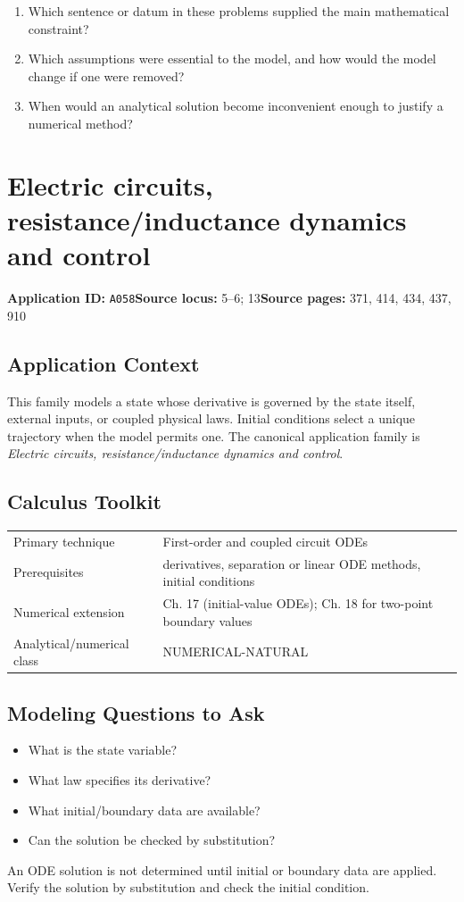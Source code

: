 \documentclass[11pt]{book}
\newcommand{\pid}[1]{\texttt{#1}}
\begin{document}
\begin{reflectionbox}\begin{enumerate}
\item Which sentence or datum in these problems supplied the main mathematical constraint?
\item Which assumptions were essential to the model, and how would the model change if one were removed?
\item When would an analytical solution become inconvenient enough to justify a numerical method?
\end{enumerate}\end{reflectionbox}
\chapter{Electric circuits, resistance/inductance dynamics and control}\label{app:A058}
\textbf{Application ID:} \pid{A058}\quad \textbf{Source locus:} 5–6; 13\quad \textbf{Source pages:} 371, 414, 434, 437, 910
\section*{Application Context}
This family models a state whose derivative is governed by the state itself, external inputs, or coupled physical laws. Initial conditions select a unique trajectory when the model permits one. The canonical application family is \emph{Electric circuits, resistance/inductance dynamics and control}.
\section*{Calculus Toolkit}
\begin{tabularx}{\textwidth}{@{}lX@{}}\toprule
Primary technique & First-order and coupled circuit ODEs \\
Prerequisites & derivatives, separation or linear ODE methods, initial conditions \\
Numerical extension & Ch. 17 (initial-value ODEs); Ch. 18 for two-point boundary values \\
Analytical/numerical class & NUMERICAL-NATURAL \\
\bottomrule\end{tabularx}
\section*{Modeling Questions to Ask}\begin{itemize}
\item What is the state variable?
\item What law specifies its derivative?
\item What initial/boundary data are available?
\item Can the solution be checked by substitution?
\end{itemize}
\begin{errorbox}An ODE solution is not determined until initial or boundary data are applied. Verify the solution by substitution and check the initial condition.\end{errorbox}
\end{document}
